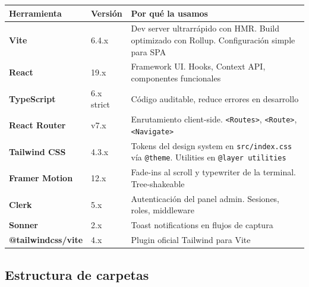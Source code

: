 \documentclass[11pt, a4paper]{article}
\newcommand{\ruta}[1]{\texttt{\color{accent2}#1}}
\begin{document}
\begin{table}[h]
\centering
\begin{tabularx}{\linewidth}{>{\bfseries}l >{\ttfamily\small}l X}
\toprule
Herramienta & Versión & Por qué la usamos \\
\midrule
Vite & 6.4.x &
  Dev server ultrarrápido con HMR. Build optimizado con Rollup.
  Configuración simple para SPA \\
React & 19.x &
  Framework UI. Hooks, Context API, componentes funcionales \\
TypeScript & 6.x strict &
  Código auditable, reduce errores en desarrollo \\
React Router & v7.x &
  Enrutamiento client-side. \texttt{<Routes>}, \texttt{<Route>}, \texttt{<Navigate>} \\
Tailwind CSS & 4.3.x &
  Tokens del design system en \ruta{src/index.css} vía \texttt{@theme}.
  Utilities en \texttt{@layer utilities} \\
Framer Motion & 12.x &
  Fade-ins al scroll y typewriter de la terminal. Tree-shakeable \\
Clerk & 5.x &
  Autenticación del panel admin. Sesiones, roles, middleware \\
Sonner & 2.x &
  Toast notifications en flujos de captura \\
@tailwindcss/vite & 4.x &
  Plugin oficial Tailwind para Vite \\
\bottomrule
\end{tabularx}
\end{table}

\subsection{Estructura de carpetas}
\end{document}
